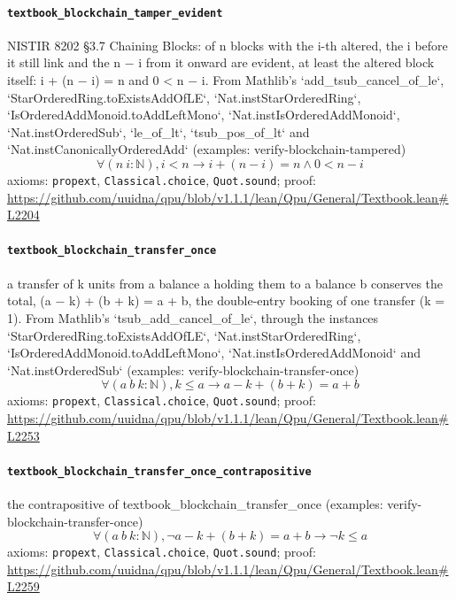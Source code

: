 \documentclass[11pt]{article}
\begin{document}
\paragraph{\texttt{textbook\_blockchain\_tamper\_evident}}
NISTIR 8202 §3.7 Chaining Blocks: of n blocks with the i-th altered, the i before it still link and the n − i from it onward are evident, at least the altered block itself: i + (n − i) = n and 0 < n − i. From Mathlib's `add\_tsub\_cancel\_of\_le`, `StarOrderedRing.toExistsAddOfLE`, `Nat.instStarOrderedRing`, `IsOrderedAddMonoid.toAddLeftMono`, `Nat.instIsOrderedAddMonoid`, `Nat.instOrderedSub`, `le\_of\_lt`, `tsub\_pos\_of\_lt` and `Nat.instCanonicallyOrderedAdd` (examples: verify-blockchain-tampered)
\[ \forall (n\ i : \mathbb{N}), i < n \to i + (n - i) = n \land 0 < n - i \]
\noindent axioms: \texttt{propext}, \texttt{Classical.choice}, \texttt{Quot.sound}; proof: \url{https://github.com/uuidna/qpu/blob/v1.1.1/lean/Qpu/General/Textbook.lean\#L2204}

\paragraph{\texttt{textbook\_blockchain\_transfer\_once}}
a transfer of k units from a balance a holding them to a balance b conserves the total, (a − k) + (b + k) = a + b, the double-entry booking of one transfer (k = 1). From Mathlib's `tsub\_add\_cancel\_of\_le`, through the instances `StarOrderedRing.toExistsAddOfLE`, `Nat.instStarOrderedRing`, `IsOrderedAddMonoid.toAddLeftMono`, `Nat.instIsOrderedAddMonoid` and `Nat.instOrderedSub` (examples: verify-blockchain-transfer-once)
\[ \forall (a\ b\ k : \mathbb{N}), k \le a \to a - k + (b + k) = a + b \]
\noindent axioms: \texttt{propext}, \texttt{Classical.choice}, \texttt{Quot.sound}; proof: \url{https://github.com/uuidna/qpu/blob/v1.1.1/lean/Qpu/General/Textbook.lean\#L2253}

\paragraph{\texttt{textbook\_blockchain\_transfer\_once\_contrapositive}}
the contrapositive of textbook\_blockchain\_transfer\_once (examples: verify-blockchain-transfer-once)
\[ \forall (a\ b\ k : \mathbb{N}), \neg a - k + (b + k) = a + b \to \neg k \le a \]
\noindent axioms: \texttt{propext}, \texttt{Classical.choice}, \texttt{Quot.sound}; proof: \url{https://github.com/uuidna/qpu/blob/v1.1.1/lean/Qpu/General/Textbook.lean\#L2259}
\end{document}
